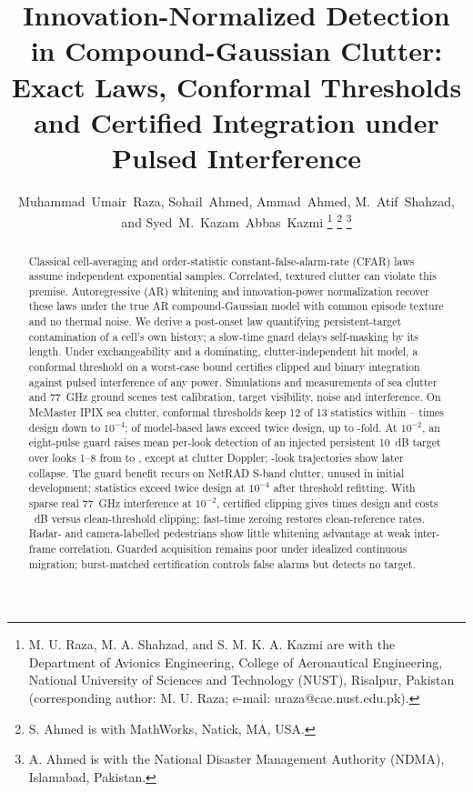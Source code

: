 \documentclass[journal]{IEEEtran}
\begin{document}
\title{Innovation-Normalized Detection in Compound-Gaussian Clutter: Exact Laws, Conformal Thresholds and Certified Integration under Pulsed Interference}

\author{Muhammad~Umair~Raza, Sohail~Ahmed, Ammad~Ahmed, M.~Atif~Shahzad, and Syed~M.~Kazam~Abbas~Kazmi%
\thanks{M. U. Raza, M. A. Shahzad, and S. M. K. A. Kazmi are with the Department of Avionics Engineering, College of Aeronautical Engineering, National University of Sciences and Technology (NUST), Risalpur, Pakistan (corresponding author: M. U. Raza; e-mail: uraza@cae.nust.edu.pk).}%
\thanks{S. Ahmed is with MathWorks, Natick, MA, USA.}%
\thanks{A. Ahmed is with the National Disaster Management Authority (NDMA), Islamabad, Pakistan.}}

\maketitle

\begin{abstract}
Classical cell-averaging and order-statistic constant-false-alarm-rate (CFAR) laws assume independent exponential samples. Correlated, textured clutter can violate this premise. Autoregressive (AR) whitening and innovation-power normalization recover these laws under the true AR compound-Gaussian model with common episode texture and no thermal noise. We derive a post-onset law quantifying persistent-target contamination of a cell's own history; a slow-time guard delays self-masking by its length. Under exchangeability and a dominating, clutter-independent hit model, a conformal threshold on a worst-case bound certifies clipped and binary integration against pulsed interference of any power. Simulations and measurements of sea clutter and 77~GHz ground scenes test calibration, target visibility, noise and interference. On McMaster IPIX sea clutter, conformal thresholds keep 12 of 13 statistics within \LConfMinFour--\LConfMaxFour{} times design down to $10^{-4}$; \NWhitenedLawsFail{} of \NWhitenedLaws{} model-based laws exceed twice design, up to \LAnalMaxFour-fold. At $10^{-2}$, an eight-pulse guard raises mean per-look detection of an injected persistent 10~dB target over looks 1--8 from \GuardMeanLookZero{} to \GuardMeanLookEight, except at clutter Doppler; \LongLooks{}-look trajectories show later collapse. The guard benefit recurs on NetRAD S-band clutter, unused in initial development; \NetNOverTwoFourWord{} statistics exceed twice design at $10^{-4}$ after threshold refitting. With sparse real 77~GHz interference at $10^{-2}$, certified clipping gives \JCertPfaC{} times design and costs \JCertCostAll~dB versus clean-threshold clipping; fast-time zeroing restores clean-reference rates. Radar- and camera-labelled pedestrians show little whitening advantage at weak inter-frame correlation. Guarded acquisition remains poor under idealized continuous migration; burst-matched certification controls false alarms but detects no target.
\end{abstract}
\end{document}
